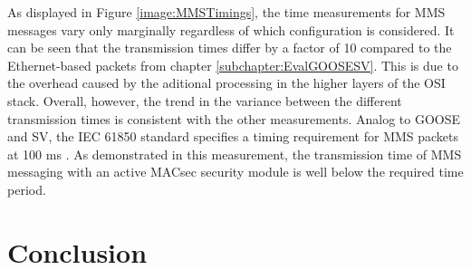 \documentclass[conference, onecolumn, a4paper]{IEEEtran}
\begin{document}
\noindent As displayed in Figure \ref{image:MMSTimings}, the time measurements for MMS messages vary only marginally regardless of which configuration 
is considered. It can be seen that the transmission times differ by a factor of 10 compared to the Ethernet-based packets from chapter \ref{subchapter:EvalGOOSESV}.
This is due to the overhead caused by the aditional processing in the higher layers of the OSI stack. Overall, however, the trend in the variance between 
the different transmission times is consistent with the other measurements. Analog to GOOSE and SV, the IEC 61850 standard specifies a timing requirement 
for MMS packets at 100 ms \cite{fixedLatencyGOOSESV:2021}. As demonstrated in this measurement, the transmission time of MMS messaging with an active MACsec 
security module is well below the required time period. 


\section{Conclusion}
\label{chapter:conclusion}


\printbibliography
\end{document}
